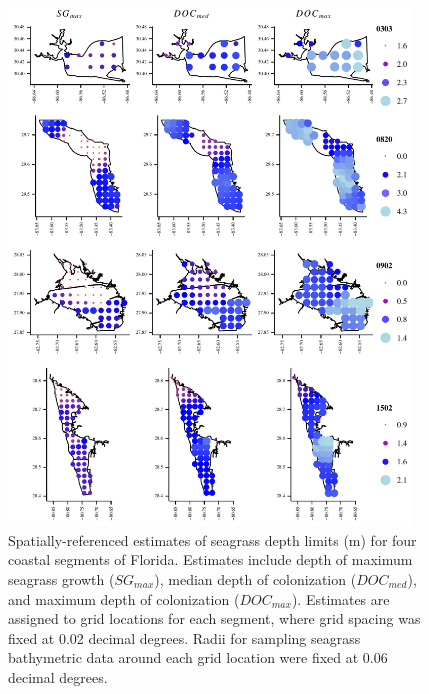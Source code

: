 \documentclass[letterpaper,12pt,oneside]{article}\usepackage[]{graphicx}\usepackage[]{color}
\begin{document}
\begin{figure}
\centering
\includegraphics[width = 0.95\textwidth]{figs/all_ests.pdf}
\caption{Spatially-referenced estimates of seagrass depth limits (m) for four coastal segments of Florida.  Estimates include depth of maximum seagrass growth ($SG_{max}$), median depth of colonization ($DOC_{med}$), and maximum depth of colonization ($DOC_{max}$).  Estimates are assigned to grid locations for each segment, where grid spacing was fixed at 0.02 decimal degrees.  Radii for sampling seagrass bathymetric data around each grid location were fixed at 0.06 decimal degrees.}
\label{fig:all_ests}
\end{figure}
\end{document}
